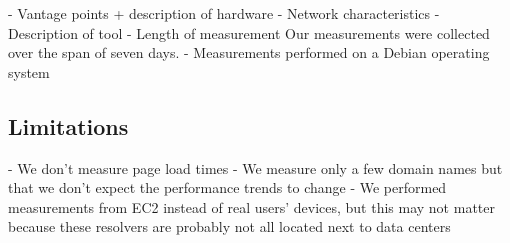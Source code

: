 - Vantage points + description of hardware
- Network characteristics
- Description of tool
- Length of measurement
Our measurements were collected over the span of seven days. 
- Measurements performed on a Debian operating system 

\subsection{Limitations}
	- We don't measure page load times 	
	- We measure only a few domain names but that we don’t expect the performance trends to change
	- We performed measurements from EC2 instead of real users’ devices, but this may not matter because these resolvers are probably not all located next to data centers
